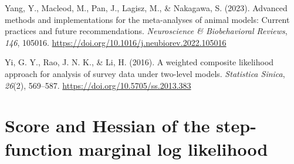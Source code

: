 \documentclass[
  american,
  man, donotrepeattitle,floatsintext]{apa7}
\newlength{\cslhangindent}
\newenvironment{CSLReferences}[2] %
 {\begin{list}{}{%
  \setlength{\itemindent}{0pt}
  \setlength{\leftmargin}{0pt}
  \setlength{\parsep}{0pt}
  \ifodd #1
   \setlength{\leftmargin}{\cslhangindent}
   \setlength{\itemindent}{-1\cslhangindent}
  \fi
  \setlength{\itemsep}{#2\baselineskip}}}
 {\end{list}}
\begin{document}
\begin{CSLReferences}{1}{0}
Yang, Y., Macleod, M., Pan, J., Lagisz, M., \& Nakagawa, S. (2023). Advanced methods and implementations for the meta-analyses of animal models: {Current} practices and future recommendations. \emph{Neuroscience \& Biobehavioral Reviews}, \emph{146}, 105016. \url{https://doi.org/10.1016/j.neubiorev.2022.105016}

Yi, G. Y., Rao, J. N. K., \& Li, H. (2016). A weighted composite likelihood approach for analysis of survey data under two-level models. \emph{Statistica Sinica}, \emph{26}(2), 569--587. \url{https://doi.org/10.5705/ss.2013.383}

\end{CSLReferences}

\endgroup

\appendix


\section{Score and Hessian of the step-function marginal log likelihood}\label{CML-derivatives}
\end{document}

